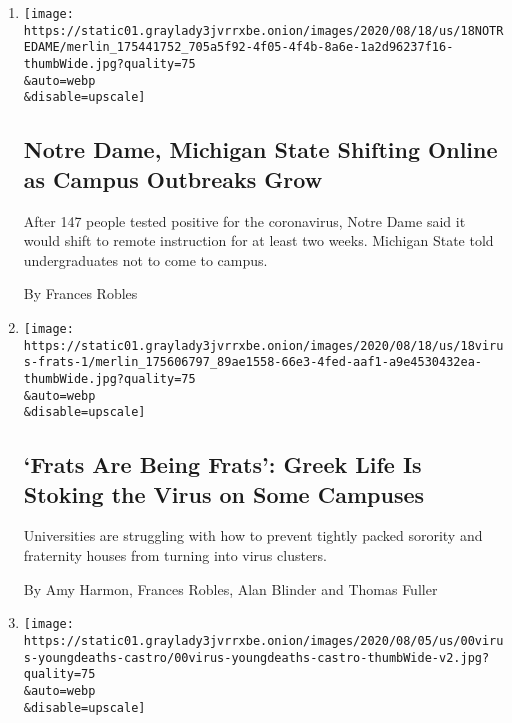 \begin{enumerate}
\def\labelenumi{\arabic{enumi}.}
\item
  \href{/2020/08/18/us/notre-dame-coronavirus.html}{}

  \texttt{[image: https://static01.graylady3jvrrxbe.onion/images/2020/08/18/us/18NOTREDAME/merlin\_175441752\_705a5f92-4f05-4f4b-8a6e-1a2d96237f16-thumbWide.jpg?quality=75\\\&auto=webp\\\&disable=upscale]}

  \hypertarget{notre-dame-michigan-state-shifting-online-as-campus-outbreaks-grow}{%
  \subsection{Notre Dame, Michigan State Shifting Online as Campus
  Outbreaks
  Grow}\label{notre-dame-michigan-state-shifting-online-as-campus-outbreaks-grow}}

  After 147 people tested positive for the coronavirus, Notre Dame said
  it would shift to remote instruction for at least two weeks. Michigan
  State told undergraduates not to come to campus.

  By Frances Robles
\item
  \href{/2020/08/18/us/coronavirus-fraternities-sororities.html}{}

  \texttt{[image: https://static01.graylady3jvrrxbe.onion/images/2020/08/18/us/18virus-frats-1/merlin\_175606797\_89ae1558-66e3-4fed-aaf1-a9e4530432ea-thumbWide.jpg?quality=75\\\&auto=webp\\\&disable=upscale]}

  \hypertarget{frats-are-being-frats-greek-life-is-stoking-the-virus-on-some-campuses}{%
  \subsection{`Frats Are Being Frats': Greek Life Is Stoking the Virus
  on Some
  Campuses}\label{frats-are-being-frats-greek-life-is-stoking-the-virus-on-some-campuses}}

  Universities are struggling with how to prevent tightly packed
  sorority and fraternity houses from turning into virus clusters.

  By Amy Harmon, Frances Robles, Alan Blinder and Thomas Fuller
\item
  \href{/2020/08/11/us/virus-young-deaths.html}{}

  \texttt{[image: https://static01.graylady3jvrrxbe.onion/images/2020/08/05/us/00virus-youngdeaths-castro/00virus-youngdeaths-castro-thumbWide-v2.jpg?quality=75\\\&auto=webp\\\&disable=upscale]}


\end{enumerate}
